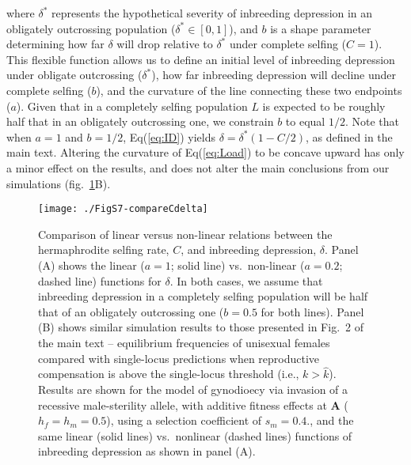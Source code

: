 \documentclass{article}
\begin{document}
\noindent where $\delta^\ast$ represents the hypothetical severity of inbreeding depression in an obligately outcrossing population ($\delta^\ast \in [0,1]$), and $b$ is a shape parameter determining how far $\delta$ will drop relative to $\delta^{\ast}$ under complete selfing ($C = 1$). This flexible function allows us to define an initial level of inbreeding depression under obligate outcrossing ($\delta^\ast$), how far inbreeding depression will decline under complete selfing ($b$), and the curvature of the line connecting these two endpoints ($a$). Given that in a completely selfing population $L$ is expected to be roughly half that in an obligately outcrossing one, we constrain $b$ to equal $1/2$. Note that when $a=1$ and $b=1/2$, Eq(\ref{eq:ID}) yields $\delta = \delta^\ast(1 - C/2)$, as defined in the main text. Altering the curvature of Eq(\ref{eq:Load}) to be concave upward has only a minor effect on the results, and does not alter the main conclusions from our simulations (fig.~\ref{fig:Cdelta}B).

\begin{figure}[ht!]
\centering
\texttt{[image: ./FigS7-compareCdelta]}
\caption{Comparison of linear versus non-linear relations between the hermaphrodite selfing rate, $C$, and inbreeding depression, $\delta$. Panel (A) shows the linear ($a=1$; solid line) vs.~non-linear ($a=0.2$; dashed line) functions for $\delta$. In both cases, we assume that inbreeding depression in a completely selfing population will be half that of an obligately outcrossing one ($b=0.5$ for both lines). Panel (B) shows similar simulation results to those presented in Fig.~2 of the main text -- equilibrium frequencies of unisexual females compared with single-locus predictions when reproductive compensation is above the single-locus threshold (i.e., $k > \hat{k}$). Results are shown for the model of gynodioecy via invasion of a recessive male-sterility allele, with additive fitness effects at $\mathbf{A}$ ($h_f = h_m = 0.5$), using a selection coefficient of $s_m = 0.4$., and the same linear (solid lines) vs.~nonlinear (dashed lines) functions of inbreeding depression as shown in panel (A).}
\label{fig:Cdelta}
\end{figure}



\clearpage


\end{document}
